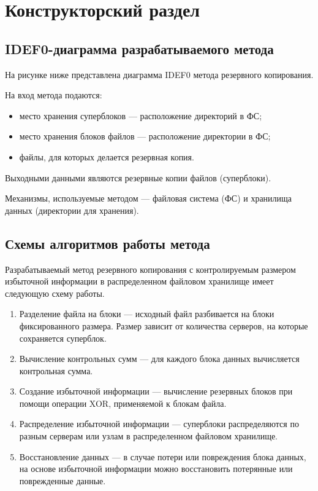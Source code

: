 \chapter{Конструкторский раздел}

\section{IDEF0-диаграмма разрабатываемого метода}

На рисунке ниже представлена диаграмма IDEF0 метода резервного копирования.


\begin{flushleft}
На вход метода подаются:
\end{flushleft}
\begin{itemize}
\item место хранения суперблоков --- расположение директорий в ФС;
\item место хранения блоков файлов --- расположение директории в ФС;
\item файлы, для которых делается резервная копия.
\end{itemize}

Выходными данными являются резервные копии файлов (суперблоки).  

Механизмы, используемые методом --- файловая система (ФС) и хранилища данных (директории для хранения).  

\newpage
\section{Схемы алгоритмов работы метода}
Разрабатываемый метод резервного копирования с контролируемым размером избыточной информации в распределенном файловом хранилище имеет следующую схему работы.
\begin{enumerate}
\item Разделение файла на блоки --- исходный файл разбивается на блоки фиксированного размера. Размер зависит от количества серверов, на которые сохраняется суперблок.  

\item Вычисление контрольных сумм --- для каждого блока данных вычисляется контрольная сумма.

\item Создание избыточной информации --- вычисление резервных блоков при помощи операции XOR, применяемой к блокам файла.

\item Распределение избыточной информации --- суперблоки распределяются по разным серверам или узлам в распределенном файловом хранилище.

\item Восстановление данных --- в случае потери или повреждения блока данных, на основе избыточной информации можно восстановить потерянные или поврежденные данные.
\end{enumerate}

